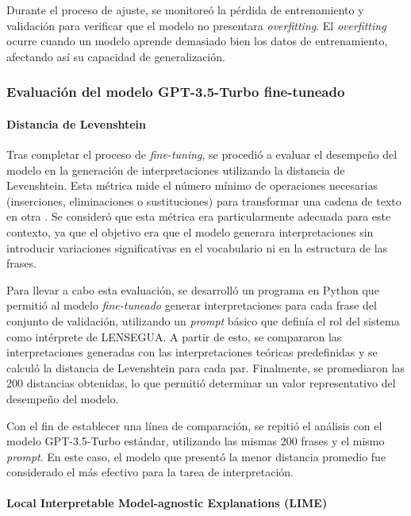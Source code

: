Durante el proceso de ajuste, se monitoreó la pérdida de entrenamiento y validación para verificar que el modelo no presentara \textit{overfitting}. El \textit{overfitting} ocurre cuando un modelo aprende demasiado bien los datos de entrenamiento, afectando así su capacidad de generalización. 


\subsubsection{Evaluación del modelo GPT-3.5-Turbo fine-tuneado}

\paragraph{Distancia de Levenshtein}

Tras completar el proceso de \textit{fine-tuning}, se procedió a evaluar el desempeño del modelo en la generación de interpretaciones utilizando la distancia de Levenshtein. Esta métrica mide el número mínimo de operaciones necesarias (inserciones, eliminaciones o sustituciones) para transformar una cadena de texto en otra \cite{thirtynine}. Se consideró que esta métrica era particularmente adecuada para este contexto, ya que el objetivo era que el modelo generara interpretaciones sin introducir variaciones significativas en el vocabulario ni en la estructura de las frases. 

Para llevar a cabo esta evaluación, se desarrolló un programa en Python que permitió al modelo \textit{fine-tuneado} generar interpretaciones para cada frase del conjunto de validación, utilizando un \textit{prompt} básico que definía el rol del sistema como intérprete de LENSEGUA. A partir de esto, se compararon las interpretaciones generadas con las interpretaciones teóricas predefinidas y se calculó la distancia de Levenshtein para cada par. Finalmente, se promediaron las 200 distancias obtenidas, lo que permitió determinar un valor representativo del desempeño del modelo.

Con el fin de establecer una línea de comparación, se repitió el análisis con el modelo GPT-3.5-Turbo estándar, utilizando las mismas 200 frases y el mismo \textit{prompt}. En este caso, el modelo que presentó la menor distancia promedio fue considerado el más efectivo para la tarea de interpretación.

\paragraph{Local Interpretable Model-agnostic Explanations (LIME)}

